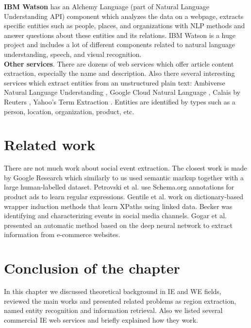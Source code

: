 \noindent \textbf{IBM Watson} \cite{IBMAlchemy} has an Alchemy Language (part of Natural Language Understanding API) component which analyzes the data on a webpage, extracts specific entities such as people, places, and organizations with NLP methods and answer questions about these entities and its relations. IBM Watson is a huge project and includes a lot of different components related to natural language understanding, speech, and visual recognition.\\  

\noindent\textbf{Other services}. There are dozens of web services which offer article content extraction, especially the name and description. Also there several interesting services which extract entities from an unstructured plain text: Ambiverse Natural Language Understanding \cite{Ambiverse}, Google Cloud Natural Language \cite{GoogNLP}, Calais by Reuters \cite{calais}, Yahoo’s Term Extraction \cite{yahoo}. Entities are identified by types such as a person, location, organization, product, etc.

\section{Related work}

There are not much work about social event extraction. The closest work is made by Google Research \cite{GoogEvent} which similarly to us used semantic markup together with a large human-labelled dataset. Petrovski et al. \cite{Petrovski} use Schema.org annotations for product ads to learn regular expressions. Gentile et al. \cite{Gentile} work on dictionary-based wrapper induction methods that learn XPaths using linked data. Becker \cite{becker} was identifying
and characterizing events in social media channels. Gogar et al. \cite{Gogar2016}
presented an automatic method based on the deep neural network to extract information from e-commerce websites.

\section*{Conclusion of the chapter}
In this chapter we discussed theoretical background in IE and WE fields, reviewed the main works and presented related problems as region extraction, named entity recognition and information retrieval. Also we listed several commercial IE web services and briefly explained how they work.